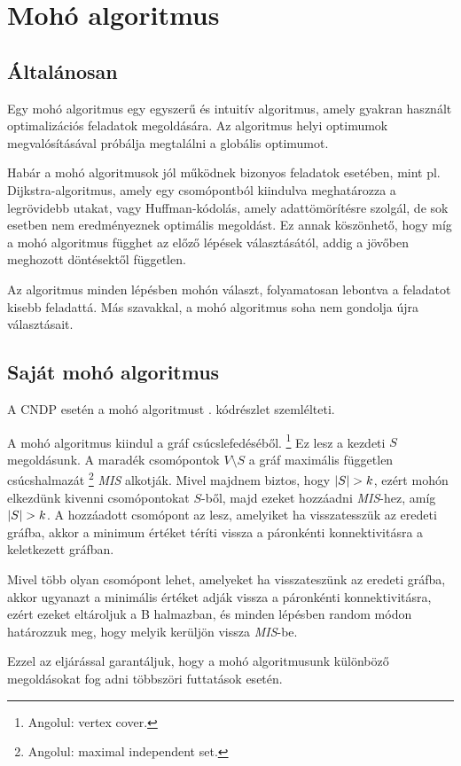 \section{Mohó algoritmus}\label{sec:MOHO_ALGORITMUS}

\subsection{Általánosan}
Egy mohó algoritmus egy egyszerű és intuitív algoritmus, amely gyakran használt
optimalizációs feladatok megoldására. Az algoritmus helyi optimumok megvalósításával próbálja
megtalálni a globális optimumot.

Habár a mohó algoritmusok jól működnek bizonyos feladatok esetében,
mint pl. Dijkstra-algoritmus, amely egy csomópontból kiindulva meghatározza a legrövidebb utakat,
vagy Huffman-kódolás, amely adattömörítésre szolgál, de sok esetben nem eredményeznek optimális megoldást.
Ez annak köszönhető, hogy míg a mohó algoritmus függhet az előző lépések választásától,
addig a jövőben meghozott döntésektől független.

Az algoritmus minden lépésben mohón választ, folyamatosan lebontva a feladatot kisebb feladattá.
Más szavakkal, a mohó algoritmus soha nem gondolja újra választásait.

\subsection{Saját mohó algoritmus}
A CNDP esetén a mohó algoritmust . kódrészlet szemlélteti.


A mohó algoritmus kiindul a gráf csúcslefedéséből.
\footnote{
  Angolul: vertex cover.
}
Ez lesz a kezdeti $S$ megoldásunk.
A maradék csomópontok $V \setminus S$  a gráf maximális független csúcshalmazát
\footnote{
  Angolul: maximal independent set.
}
\emph{MIS} alkotják.
Mivel majdnem biztos, hogy $\lvert S\rvert > k$, ezért mohón elkezdünk kivenni csomópontokat $S$-ből,
majd ezeket hozzáadni \emph{MIS}-hez, amíg $\lvert S\rvert > k$.
A hozzáadott csomópont az lesz, amelyiket ha visszatesszük az eredeti gráfba,
akkor a minimum értéket téríti vissza a páronkénti konnektivitásra a keletkezett gráfban.

Mivel több olyan csomópont lehet, amelyeket ha visszateszünk az eredeti gráfba,
akkor ugyanazt a minimális értéket adják vissza a páronkénti konnektivitásra,
ezért ezeket eltároljuk a B halmazban, és minden lépésben random módon határozzuk meg,
hogy melyik kerüljön vissza \emph{MIS}-be.

Ezzel az eljárással garantáljuk, hogy a mohó algoritmusunk különböző megoldásokat fog adni
többszöri futtatások esetén.
